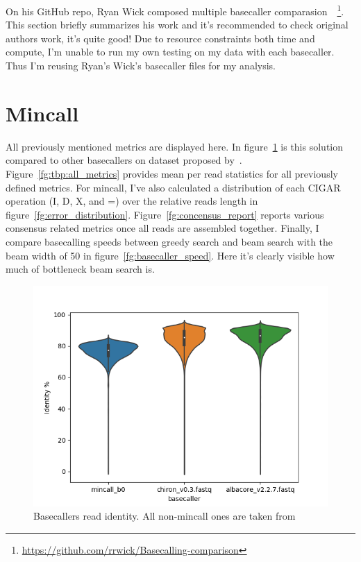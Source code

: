 \documentclass[times, utf8, diplomski, english]{fer}
\begin{document}
On his GitHub repo, Ryan Wick composed multiple basecaller comparasion~\citep{rwick_basecalling_cmp}~\footnote{\url{https://github.com/rrwick/Basecalling-comparison}}. 
This section briefly summarizes his work and it's recommended to check original authors work, it's quite good! 
Due to resource constraints both time and compute, I'm unable to run my own testing on my data with each basecaller. Thus I'm reusing Ryan's Wick's basecaller files for my analysis. 

\section{Mincall}
All previously mentioned metrics are displayed here. In figure~\ref{fg:identity_rate} is this solution compared to other basecallers on dataset proposed by~\citep{rwick_basecalling_cmp}.
Figure~\ref{fg:tbp:all_metrics} provides mean per read statistics for all previously defined metrics. 
For mincall, I've also calculated a distribution of each CIGAR operation (I, D, X, and =) over the relative reads length in figure~\ref{fg:error_distribution}.
Figure~\ref{fg:concensus_report} reports various consensus related metrics once all reads are assembled together.
Finally, I compare basecalling speeds between greedy search and beam search with the beam width of 50 in figure~\ref{fg:basecaller_speed}. 
Here it's clearly visible how much of bottleneck beam search is.

\begin{figure}
    \label{fg:identity_rate}
    \begin{center}
        \includegraphics[width=\textwidth]{read_violin_Identity}
        \caption{Basecallers read identity. All non-mincall ones are taken from~\cite{rwick_basecalling_cmp}}
    \end{center}
\end{figure}
\end{document}
